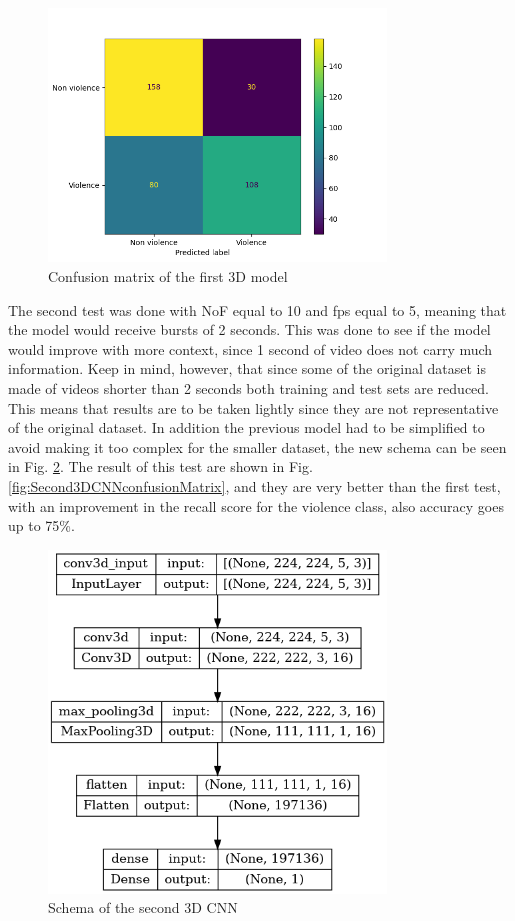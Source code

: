 \begin{figure}[]
    \centering
    \includegraphics[width=0.8\textwidth]{images/7f2d-testGiacomo3D9-9fcf-conf_matrix.png}
    \caption{Confusion matrix of the first 3D model}
    \label{fig:First3DCNNconfusionMatrix}
\end{figure}

The second test was done with NoF equal to 10 and fps equal to 5, meaning that the model would receive bursts of 2 seconds. This was done to see if the model would improve with more context, since 1 second of video does not carry much information. Keep in mind, however, that since some of the original dataset is made of videos shorter than 2 seconds both training and test sets are reduced. This means that results are to be taken lightly since they are not representative of the original dataset. In addition the previous model had to be simplified to avoid making it too complex for the smaller dataset, the new schema can be seen in Fig. \ref{fig:3D3CNNschema}. The result of this test are shown in Fig. \ref{fig:Second3DCNNconfusionMatrix}, and they are very better than the first test, with an improvement in the recall score for the violence class, also accuracy goes up to 75\%.
\begin{figure}[]
    \centering
    \includegraphics[width=0.8\textwidth, height=0.6\textwidth, keepaspectratio]{images/3D3CNNschema.png}
    \caption{Schema of the second 3D CNN}
    \label{fig:3D3CNNschema}
\end{figure}

